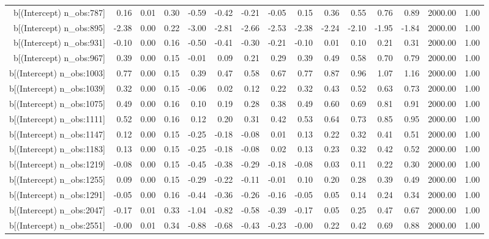 \begin{table}[ht]
\begin{tabular}{rrrrrrrrrrrrrrr}
  b[(Intercept) n\_obs:787] & 0.16 & 0.01 & 0.30 & -0.59 & -0.42 & -0.21 & -0.05 & 0.15 & 0.36 & 0.55 & 0.76 & 0.89 & 2000.00 & 1.00 \\ 
  b[(Intercept) n\_obs:895] & -2.38 & 0.00 & 0.22 & -3.00 & -2.81 & -2.66 & -2.53 & -2.38 & -2.24 & -2.10 & -1.95 & -1.84 & 2000.00 & 1.00 \\ 
  b[(Intercept) n\_obs:931] & -0.10 & 0.00 & 0.16 & -0.50 & -0.41 & -0.30 & -0.21 & -0.10 & 0.01 & 0.10 & 0.21 & 0.31 & 2000.00 & 1.00 \\ 
  b[(Intercept) n\_obs:967] & 0.39 & 0.00 & 0.15 & -0.01 & 0.09 & 0.21 & 0.29 & 0.39 & 0.49 & 0.58 & 0.70 & 0.79 & 2000.00 & 1.00 \\ 
  b[(Intercept) n\_obs:1003] & 0.77 & 0.00 & 0.15 & 0.39 & 0.47 & 0.58 & 0.67 & 0.77 & 0.87 & 0.96 & 1.07 & 1.16 & 2000.00 & 1.00 \\ 
  b[(Intercept) n\_obs:1039] & 0.32 & 0.00 & 0.15 & -0.06 & 0.02 & 0.12 & 0.22 & 0.32 & 0.43 & 0.52 & 0.63 & 0.73 & 2000.00 & 1.00 \\ 
  b[(Intercept) n\_obs:1075] & 0.49 & 0.00 & 0.16 & 0.10 & 0.19 & 0.28 & 0.38 & 0.49 & 0.60 & 0.69 & 0.81 & 0.91 & 2000.00 & 1.00 \\ 
  b[(Intercept) n\_obs:1111] & 0.52 & 0.00 & 0.16 & 0.12 & 0.20 & 0.31 & 0.42 & 0.53 & 0.64 & 0.73 & 0.85 & 0.95 & 2000.00 & 1.00 \\ 
  b[(Intercept) n\_obs:1147] & 0.12 & 0.00 & 0.15 & -0.25 & -0.18 & -0.08 & 0.01 & 0.13 & 0.22 & 0.32 & 0.41 & 0.51 & 2000.00 & 1.00 \\ 
  b[(Intercept) n\_obs:1183] & 0.13 & 0.00 & 0.15 & -0.25 & -0.18 & -0.08 & 0.02 & 0.13 & 0.23 & 0.32 & 0.42 & 0.52 & 2000.00 & 1.00 \\ 
  b[(Intercept) n\_obs:1219] & -0.08 & 0.00 & 0.15 & -0.45 & -0.38 & -0.29 & -0.18 & -0.08 & 0.03 & 0.11 & 0.22 & 0.30 & 2000.00 & 1.00 \\ 
  b[(Intercept) n\_obs:1255] & 0.09 & 0.00 & 0.15 & -0.29 & -0.22 & -0.11 & -0.01 & 0.10 & 0.20 & 0.28 & 0.39 & 0.49 & 2000.00 & 1.00 \\ 
  b[(Intercept) n\_obs:1291] & -0.05 & 0.00 & 0.16 & -0.44 & -0.36 & -0.26 & -0.16 & -0.05 & 0.05 & 0.14 & 0.24 & 0.34 & 2000.00 & 1.00 \\ 
  b[(Intercept) n\_obs:2047] & -0.17 & 0.01 & 0.33 & -1.04 & -0.82 & -0.58 & -0.39 & -0.17 & 0.05 & 0.25 & 0.47 & 0.67 & 2000.00 & 1.00 \\ 
  b[(Intercept) n\_obs:2551] & -0.00 & 0.01 & 0.34 & -0.88 & -0.68 & -0.43 & -0.23 & -0.00 & 0.22 & 0.42 & 0.69 & 0.88 & 2000.00 & 1.00 \\ 

\end{tabular}
\end{table}
